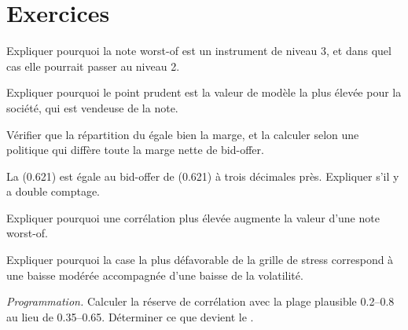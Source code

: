 \section{Exercices}

\begin{exercise}[$\star$]\label{exo:dv:managing-an-exotic-book:1}
Expliquer pourquoi la note worst-of est un instrument de niveau 3, et dans quel cas elle pourrait passer au niveau 2.
\end{exercise}

\begin{exercise}[$\star$]\label{exo:dv:managing-an-exotic-book:2}
Expliquer pourquoi le point prudent est la valeur de modèle la plus élevée pour la société, qui est vendeuse de la note.
\end{exercise}

\begin{exercise}[$\star$]\label{exo:dv:managing-an-exotic-book:3}
Vérifier que la répartition du  égale bien la marge, et la calculer selon une politique qui diffère toute la marge nette de bid-offer.
\end{exercise}

\begin{exercise}[$\star\star$]\label{exo:dv:managing-an-exotic-book:4}
La  (0.621) est égale au bid-offer de  (0.621) à trois décimales près. Expliquer s'il y a double comptage.
\end{exercise}

\begin{exercise}[$\star\star$]\label{exo:dv:managing-an-exotic-book:5}
Expliquer pourquoi une corrélation plus élevée augmente la valeur d'une note worst-of.
\end{exercise}

\begin{exercise}[$\star\star$]\label{exo:dv:managing-an-exotic-book:6}
Expliquer pourquoi la case la plus défavorable de la grille de stress correspond à une baisse modérée accompagnée d'une baisse de la volatilité.
\end{exercise}

\begin{exercise}[$\star\star\star$]\label{exo:dv:managing-an-exotic-book:7}
\emph{Programmation.} Calculer la réserve de corrélation avec la plage plausible 0.2--0.8 au lieu de 0.35--0.65. Déterminer ce que devient le .
\end{exercise}

